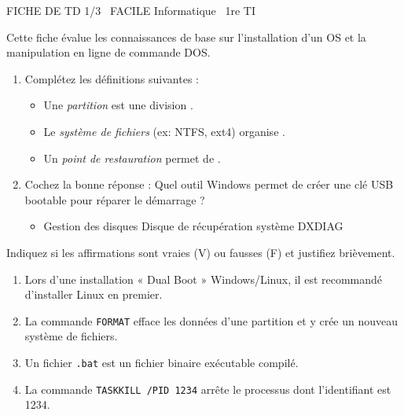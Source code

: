 \documentclass[11pt]{article}
\begin{document}
\begin{tcolorbox}[enhanced,colback=popink,colframe=popink,arc=10pt,boxrule=0pt,left=12pt,right=12pt,top=9pt,bottom=9pt]
{\color{white}\popxbold\small FICHE DE TD 1/3 \textbullet\ FACILE \hfill Informatique \textbullet\ 1re TI\par}
\end{tcolorbox}
\vspace{4pt}
Cette fiche évalue les connaissances de base sur l'installation d'un OS et la manipulation en ligne de commande DOS.

\begin{exercice}
\begin{enumerate}
    \item Complétez les définitions suivantes :
    \begin{itemize}
        \item Une \textit{partition} est une division \underline{\hspace{4cm}}.
        \item Le \textit{système de fichiers} (ex: NTFS, ext4) organise \underline{\hspace{4cm}}.
        \item Un \textit{point de restauration} permet de \underline{\hspace{4cm}}.
    \end{itemize}
    \item Cochez la bonne réponse : Quel outil Windows permet de créer une clé USB bootable pour réparer le démarrage ?
\begin{itemize}
        \item[$\square$] Gestion des disques \quad [$\square$] Disque de récupération système \quad [$\square$] DXDIAG
    \end{itemize}
\end{enumerate}
\end{exercice}

\begin{exercice}
Indiquez si les affirmations sont vraies (V) ou fausses (F) et justifiez brièvement.
\begin{enumerate}
    \item Lors d'une installation « Dual Boot » Windows/Linux, il est recommandé d'installer Linux en premier.
    \item La commande \texttt{FORMAT} efface les données d'une partition et y crée un nouveau système de fichiers.
    \item Un fichier \texttt{.bat} est un fichier binaire exécutable compilé.
    \item La commande \texttt{TASKKILL /PID 1234} arrête le processus dont l'identifiant est 1234.
\end{enumerate}
\end{exercice}
\end{document}
